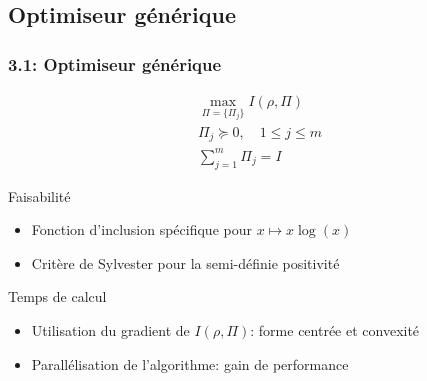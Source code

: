 \documentclass{beamer}
\begin{document}
\subsection{Optimiseur générique}
\begin{frame}
    \frametitle{3.1: Optimiseur générique}
    \begin{block}{}
        \begin{align}
            \max\limits_{\Pi = \{\Pi_j\}} I(\rho, \Pi) \\
            \Pi_j \succeq 0, \quad 1 \leq j \leq m  \\
            \displaystyle \sum_{j=1}^{m} \Pi_j = I 
        \end{align}
    \end{block}
    \begin{block}{Faisabilité}
        \begin{itemize}
            \item Fonction d'inclusion spécifique pour $x \mapsto x\log(x)$
            \item Critère de Sylvester pour la semi-définie positivité
        \end{itemize}
    \end{block}
    \pause
    \begin{block}{Temps de calcul}
        \begin{itemize}
            \item Utilisation du gradient de $I(\rho, \Pi)$: forme centrée et convexité
            \item Parallélisation de l'algorithme: gain de performance
        \end{itemize}
    \end{block}
\end{frame}
\end{document}
